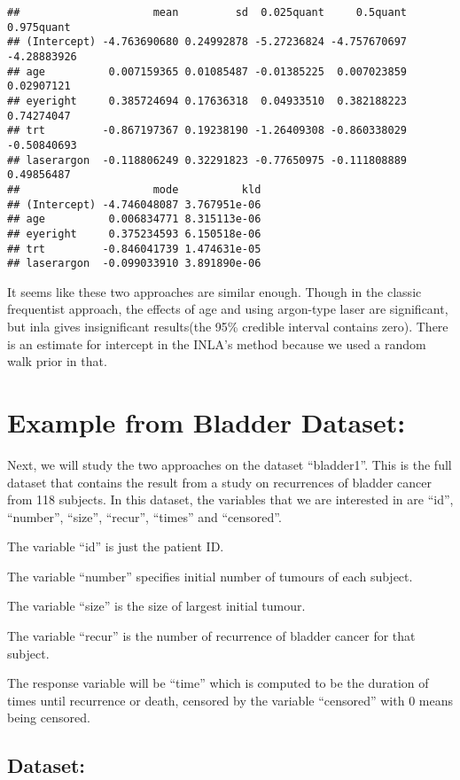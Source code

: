 \documentclass[]{article}
\begin{document}
\begin{verbatim}
##                     mean         sd  0.025quant     0.5quant  0.975quant
## (Intercept) -4.763690680 0.24992878 -5.27236824 -4.757670697 -4.28883926
## age          0.007159365 0.01085487 -0.01385225  0.007023859  0.02907121
## eyeright     0.385724694 0.17636318  0.04933510  0.382188223  0.74274047
## trt         -0.867197367 0.19238190 -1.26409308 -0.860338029 -0.50840693
## laserargon  -0.118806249 0.32291823 -0.77650975 -0.111808889  0.49856487
##                     mode          kld
## (Intercept) -4.746048087 3.767951e-06
## age          0.006834771 8.315113e-06
## eyeright     0.375234593 6.150518e-06
## trt         -0.846041739 1.474631e-05
## laserargon  -0.099033910 3.891890e-06
\end{verbatim}

It seems like these two approaches are similar enough. Though in the
classic frequentist approach, the effects of age and using argon-type
laser are significant, but inla gives insignificant results(the 95\%
credible interval contains zero). There is an estimate for intercept in
the INLA's method because we used a random walk prior in that.

\hypertarget{example-from-bladder-dataset}{%
\section{Example from Bladder
Dataset:}\label{example-from-bladder-dataset}}

Next, we will study the two approaches on the dataset ``bladder1''. This
is the full dataset that contains the result from a study on recurrences
of bladder cancer from 118 subjects. In this dataset, the variables that
we are interested in are ``id'', ``number'', ``size'', ``recur'',
``times'' and ``censored''.

The variable ``id'' is just the patient ID.

The variable ``number'' specifies initial number of tumours of each
subject.

The variable ``size'' is the size of largest initial tumour.

The variable ``recur'' is the number of recurrence of bladder cancer for
that subject.

The response variable will be ``time'' which is computed to be the
duration of times until recurrence or death, censored by the variable
``censored'' with 0 means being censored.

\hypertarget{dataset-1}{%
\subsection{Dataset:}\label{dataset-1}}
\end{document}
